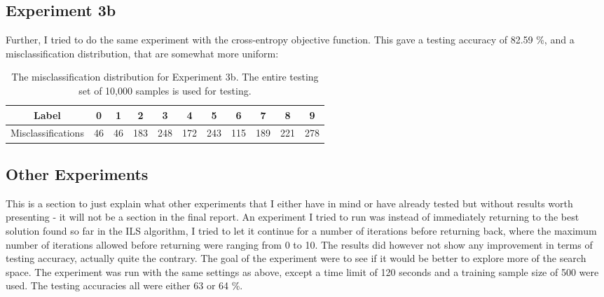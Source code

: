 \subsection{Experiment 3b}
Further, I tried to do the same experiment with the cross-entropy objective function. This gave a testing accuracy of 82.59 \%, and a misclassification distribution, that are somewhat more uniform:
\begin{table}[H]
    \centering
    \begin{tabular}{|c|c|c|c|c|c|c|c|c|c|c|}
    \hline
    Label              & 0  & 1  & 2   & 3   & 4  & 5   & 6  & 7   & 8   & 9   \\ \hline
    Misclassifications & 46 & 46 & 183 & 248 & 172 & 243 & 115 & 189 & 221 & 278 \\ \hline
    \end{tabular}
    \caption{The misclassification distribution for Experiment 3b. The entire testing set of 10,000 samples is used for testing. }
    \label{Misclassifications_exp3b}
\end{table}
\subsection{Other Experiments}
This is a section to just explain what other experiments that I either have in mind or have already tested but without results worth presenting - it will not be a section in the final report. An experiment I tried to run was instead of immediately returning to the best solution found so far in the ILS algorithm, I tried to let it continue for a number of iterations before returning back, where the maximum number of iterations allowed before returning were ranging from 0 to 10. The results did however not show any improvement in terms of testing accuracy, actually quite the contrary. The goal of the experiment were to see if it would be better to explore more of the search space. The experiment was run with the same settings as above, except a time limit of 120 seconds and a training sample size of 500 were used. The testing accuracies all were either 63 or 64 \%.